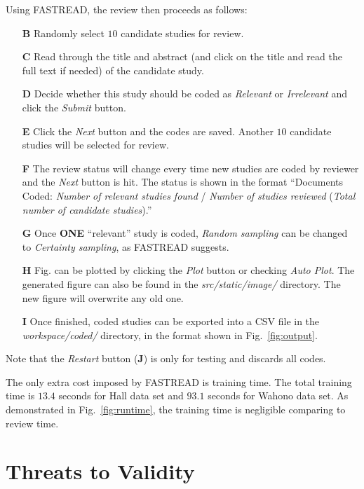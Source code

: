 \documentclass{svjour3}
\theoremstyle{break}
\begin{document}
Using FASTREAD, the review then proceeds as follows:
\begin{enumerate}
\item[\textbf{B}] Randomly select $10$ candidate studies for review.
\item[\textbf{C}] Read through the title and abstract (and click on the title and read the full text if needed) of the candidate study.
\item[\textbf{D}] Decide whether this study should be coded as \textit{Relevant} or \textit{Irrelevant} and click the \textit{Submit} button.
\item[\textbf{E}] Click the \textit{Next} button and the codes are saved. Another $10$ candidate studies will be selected for review.
\item[\textbf{F}] The review status will change every time new studies are coded by reviewer and the \textit{Next} button is hit. The status is shown in the format ``Documents Coded: \textit{Number of relevant studies found} / \textit{Number of studies reviewed} (\textit{Total number of candidate studies}).''
\item[\textbf{G}] Once \textbf{ONE} ``relevant'' study is coded, \textit{Random sampling} can be changed to \textit{Certainty sampling}, as FASTREAD suggests.
\item[\textbf{H}] Fig. can be plotted by clicking the \textit{Plot} button or checking \textit{Auto Plot}. The generated figure can also be found in the \textit{src/static/image/} directory. The new figure will overwrite any old one.
\item[\textbf{I}] Once finished, coded studies can be exported into a CSV file in the \textit{workspace/coded/} directory, in the format shown in Fig.~\ref{fig:output}.
\end{enumerate}

Note that the \textit{Restart} button (\textbf{J}) is only for testing and discards all codes.


The only extra cost imposed by FASTREAD is training time. The total training time is $13.4$ seconds for Hall data set and $93.1$ seconds for Wahono data set. As demonstrated in Fig.~\ref{fig:runtime}, the training time is negligible comparing to review time.





\section{Threats to Validity}
\label{sect: Threats to Validity}
\end{document}
